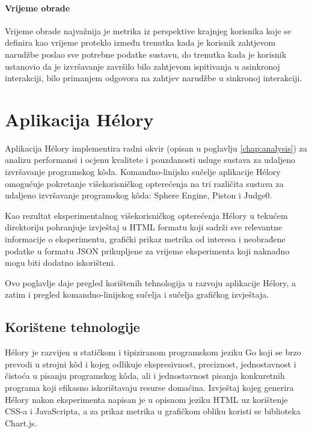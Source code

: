 \documentclass[times, utf8, diplomski]{fer}
\begin{document}
\subsubsection{Vrijeme obrade}
Vrijeme obrade  najvažnija je metrika iz perspektive krajnjeg korisnika koje se definira kao vrijeme proteklo između trenutka kada je korisnik zahtjevom narudžbe poslao sve potrebne podatke sustavu, do trenutka kada je korisnik ustanovio da je izvršavanje završilo bilo zahtjevom ispitivanja u asinkronoj interakciji, bilo primanjem odgovora na zahtjev narudžbe u sinkronoj interakciji.

\chapter{Aplikacija Hélory}
\label{chap:helory}
Aplikacija Hélory implementira radni okvir (opisan u poglavlju \ref{chap:analysis}) za analizu performansi i ocjenu kvalitete i pouzdanosti usluge sustava za udaljeno izvršavanje programskog kôda. Komandno-linijsko sučelje aplikacije Hélory omogućuje pokretanje višekorisničkog opterećenja na tri različita sustava za udaljeno izvršavanje programskog kôda: Sphere Engine, Piston i Judge0.

Kao rezultat eksperimentalnog višekorisničkog opterećenja Hélory u tekućem direktoriju pohranjuje izvještaj u HTML formatu koji sadrži sve relevantne informacije o eksperimentu, grafički prikaz metrika od interesa i neobrađene podatke u formatu JSON prikupljene za vrijeme eksperimenta koji naknadno mogu biti dodatno iskorišteni.

Ovo poglavlje daje pregled korištenih tehnologija u razvoju aplikacije Hélory, a zatim i pregled komandno-linijskog sučelja i sučelja grafičkog izvještaja.

\section{Korištene tehnologije}
Hélory je razvijen u statičkom i tipiziranom programskom jeziku Go \citep{donovan2015go} koji se brzo prevodi u strojni kôd i kojeg odlikuje ekspresivnost, preciznost, jednostavnost i čistoća u pisanju programskog kôda, ali i jednostavnost pisanja konkuretnih programa koji efikasno iskorištavaju resurse domaćina. Izvještaj kojeg generira Hélory nakon eksperimenta napisan je u opisnom jeziku HTML uz korištenje CSS-a i JavaScripta, a za prikaz metrika u grafičkom obliku koristi se biblioteka Chart.js.

\pagebreak
\end{document}
